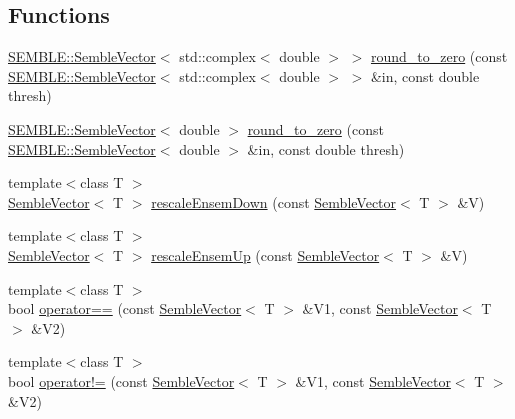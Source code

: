 \subsection*{Functions}
\begin{DoxyCompactItemize}
\item 
\mbox{\hyperlink{structSEMBLE_1_1SembleVector}{S\+E\+M\+B\+L\+E\+::\+Semble\+Vector}}$<$ std\+::complex$<$ double $>$ $>$ \mbox{\hyperlink{namespaceSEMBLE_a29461d5fa5230523d54ef8f4a974904b}{round\+\_\+to\+\_\+zero}} (const \mbox{\hyperlink{structSEMBLE_1_1SembleVector}{S\+E\+M\+B\+L\+E\+::\+Semble\+Vector}}$<$ std\+::complex$<$ double $>$ $>$ \&in, const double thresh)
\item 
\mbox{\hyperlink{structSEMBLE_1_1SembleVector}{S\+E\+M\+B\+L\+E\+::\+Semble\+Vector}}$<$ double $>$ \mbox{\hyperlink{namespaceSEMBLE_a0b915e7bcb9aa26f8723de8b033da4e0}{round\+\_\+to\+\_\+zero}} (const \mbox{\hyperlink{structSEMBLE_1_1SembleVector}{S\+E\+M\+B\+L\+E\+::\+Semble\+Vector}}$<$ double $>$ \&in, const double thresh)
\item 
{\footnotesize template$<$class T $>$ }\\\mbox{\hyperlink{structSEMBLE_1_1SembleVector}{Semble\+Vector}}$<$ T $>$ \mbox{\hyperlink{namespaceSEMBLE_aa59fa81beaaf199407f55dbfa113cc88}{rescale\+Ensem\+Down}} (const \mbox{\hyperlink{structSEMBLE_1_1SembleVector}{Semble\+Vector}}$<$ T $>$ \&V)
\item 
{\footnotesize template$<$class T $>$ }\\\mbox{\hyperlink{structSEMBLE_1_1SembleVector}{Semble\+Vector}}$<$ T $>$ \mbox{\hyperlink{namespaceSEMBLE_a04281dfd4891c67812e3dd498b78d70d}{rescale\+Ensem\+Up}} (const \mbox{\hyperlink{structSEMBLE_1_1SembleVector}{Semble\+Vector}}$<$ T $>$ \&V)
\item 
{\footnotesize template$<$class T $>$ }\\bool \mbox{\hyperlink{namespaceSEMBLE_a65452741b42f7d53a7a529b23b871ccb}{operator==}} (const \mbox{\hyperlink{structSEMBLE_1_1SembleVector}{Semble\+Vector}}$<$ T $>$ \&V1, const \mbox{\hyperlink{structSEMBLE_1_1SembleVector}{Semble\+Vector}}$<$ T $>$ \&V2)
\item 
{\footnotesize template$<$class T $>$ }\\bool \mbox{\hyperlink{namespaceSEMBLE_a721b32f2b00805e2deed8d7379276757}{operator!=}} (const \mbox{\hyperlink{structSEMBLE_1_1SembleVector}{Semble\+Vector}}$<$ T $>$ \&V1, const \mbox{\hyperlink{structSEMBLE_1_1SembleVector}{Semble\+Vector}}$<$ T $>$ \&V2)
\item 

\end{DoxyCompactItemize}
